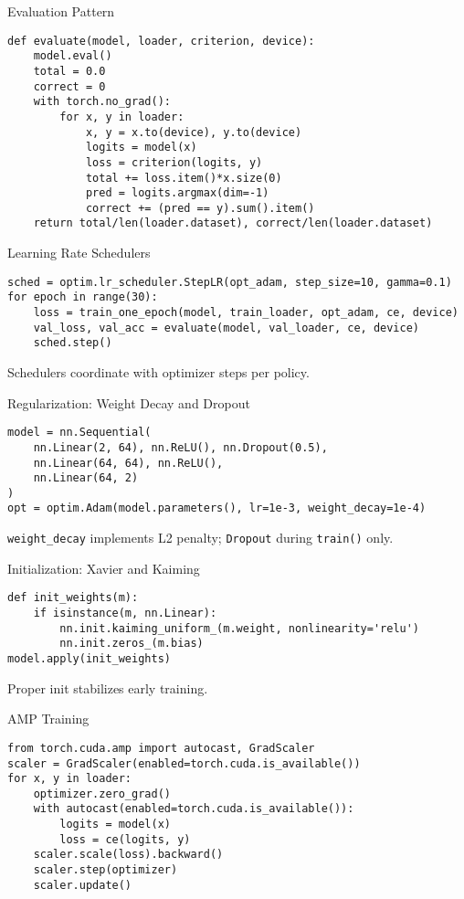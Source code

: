 \documentclass[aspectratio=169,10pt]{beamer}
\begin{document}
\begin{frame}[fragile]{Evaluation Pattern}
\begin{lstlisting}
def evaluate(model, loader, criterion, device):
    model.eval()
    total = 0.0
    correct = 0
    with torch.no_grad():
        for x, y in loader:
            x, y = x.to(device), y.to(device)
            logits = model(x)
            loss = criterion(logits, y)
            total += loss.item()*x.size(0)
            pred = logits.argmax(dim=-1)
            correct += (pred == y).sum().item()
    return total/len(loader.dataset), correct/len(loader.dataset)
\end{lstlisting}
\end{frame}

\begin{frame}[fragile]{Learning Rate Schedulers}
\begin{lstlisting}
sched = optim.lr_scheduler.StepLR(opt_adam, step_size=10, gamma=0.1)
for epoch in range(30):
    loss = train_one_epoch(model, train_loader, opt_adam, ce, device)
    val_loss, val_acc = evaluate(model, val_loader, ce, device)
    sched.step()
\end{lstlisting}
Schedulers coordinate with optimizer steps per policy.
\end{frame}

\begin{frame}[fragile]{Regularization: Weight Decay and Dropout}
\begin{lstlisting}
model = nn.Sequential(
    nn.Linear(2, 64), nn.ReLU(), nn.Dropout(0.5),
    nn.Linear(64, 64), nn.ReLU(),
    nn.Linear(64, 2)
)
opt = optim.Adam(model.parameters(), lr=1e-3, weight_decay=1e-4)
\end{lstlisting}
\texttt{weight\_decay} implements L2 penalty; \texttt{Dropout} during \texttt{train()} only.
\end{frame}

\begin{frame}[fragile]{Initialization: Xavier and Kaiming}
\begin{lstlisting}
def init_weights(m):
    if isinstance(m, nn.Linear):
        nn.init.kaiming_uniform_(m.weight, nonlinearity='relu')
        nn.init.zeros_(m.bias)
model.apply(init_weights)
\end{lstlisting}
Proper init stabilizes early training.
\end{frame}

\begin{frame}[fragile]{AMP Training}
\begin{lstlisting}
from torch.cuda.amp import autocast, GradScaler
scaler = GradScaler(enabled=torch.cuda.is_available())
for x, y in loader:
    optimizer.zero_grad()
    with autocast(enabled=torch.cuda.is_available()):
        logits = model(x)
        loss = ce(logits, y)
    scaler.scale(loss).backward()
    scaler.step(optimizer)
    scaler.update()
\end{lstlisting}
\end{frame}
\end{document}
